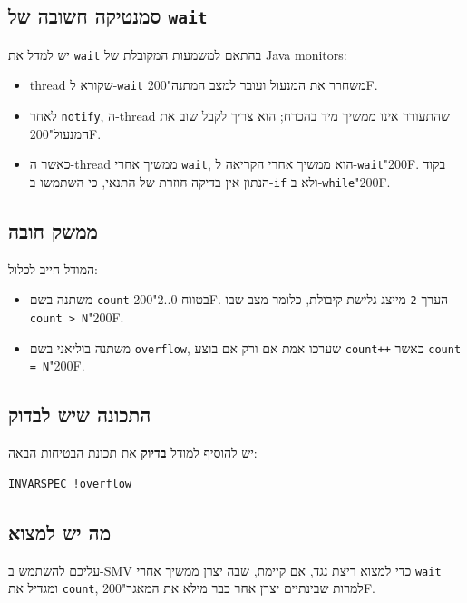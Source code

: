 \documentclass[11pt,a4paper]{article}
\newcommand{\RLM}{\char"200F}
\newenvironment{englishlisting}
  {\begin{english}\begin{flushleft}}
  {\end{flushleft}\end{english}}
\begin{document}
\subsection*{סמנטיקה חשובה של \texttt{wait}}
יש למדל את \texttt{wait} בהתאם למשמעות המקובלת של \textenglish{Java monitors}:
\begin{itemize}
  \item \textenglish{thread} שקורא ל-\texttt{wait} משחרר את המנעול ועובר למצב המתנה\RLM.
  \item לאחר \texttt{notify}, ה-\textenglish{thread} שהתעורר אינו ממשיך מיד בהכרח; הוא צריך לקבל שוב את המנעול\RLM.
  \item כאשר ה-\textenglish{thread} ממשיך אחרי \texttt{wait}, הוא ממשיך אחרי הקריאה ל-\texttt{wait}\RLM. בקוד הנתון אין בדיקה חוזרת של התנאי, כי השתמשו ב-\texttt{if} ולא ב-\texttt{while}\RLM.
\end{itemize}

\subsection*{ממשק חובה}
המודל חייב לכלול:
\begin{itemize}
  \item משתנה בשם \texttt{count} בטווח \textenglish{0..2}\RLM. הערך \texttt{2} מייצג גלישת קיבולת, כלומר מצב שבו \texttt{count > N}\RLM.
  \item משתנה בוליאני בשם \texttt{overflow}, שערכו אמת אם ורק אם בוצע \texttt{count++} כאשר \texttt{count = N}\RLM.
\end{itemize}

\subsection*{התכונה שיש לבדוק}
יש להוסיף למודל \textbf{בדיוק} את תכונת הבטיחות הבאה:
\begin{englishlisting}
\begin{lstlisting}
INVARSPEC !overflow
\end{lstlisting}
\end{englishlisting}

\subsection*{מה יש למצוא}
עליכם להשתמש ב-\textenglish{SMV} כדי למצוא ריצת נגד, אם קיימת, שבה יצרן ממשיך אחרי \texttt{wait} ומגדיל את \texttt{count}, למרות שבינתיים יצרן אחר כבר מילא את המאגר\RLM.
\end{document}
